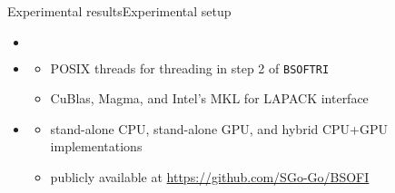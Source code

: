 \documentclass[xcolor=table,final]{beamer} %
\newcommand{\Bsoftri}{\texttt{BSOFTRI}\xspace}
\begin{document}
\begin{frame}{Experimental results}{Experimental setup}
  \renewcommand*\DTstyle{\sffamily\small}
  \renewcommand*\DTstylecomment{\footnotesize\textsl}
  \DTsetlength{0.2em}{1em}{0.2em}{0.4pt}{0.4pt}
  \begin{itemize}
  \item {}
    \begin{columns}
      \begin{column}{.5\textwidth}
      \end{column}
      \begin{column}{.5\textwidth}
      \end{column}
    \end{columns}

  \item {}
    \begin{itemize}
    \item POSIX threads for threading in step 2 of \Bsoftri
    \item CuBlas, Magma, and Intel's MKL for LAPACK interface
    \end{itemize}
    
  \item {}
    \begin{itemize}
    \item stand-alone CPU, stand-alone GPU, and hybrid CPU+GPU implementations
    \item publicly available at
      \url{https://github.com/SGo-Go/BSOFI}
    \end{itemize}
  \end{itemize}
\end{frame}
\end{document}
